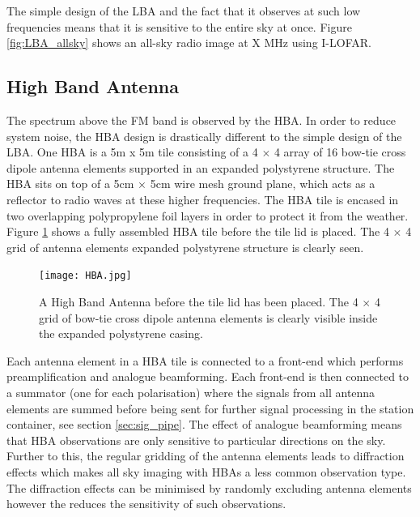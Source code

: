 The simple design of the LBA and the fact that it observes at such low frequencies means that it is sensitive to the entire sky at once. Figure \ref{fig:LBA_allsky} shows an all-sky radio image at X MHz using I-LOFAR.


\subsection{High Band Antenna}
The spectrum above the FM band is observed by the HBA. In order to reduce system noise, the HBA design is drastically different to the simple design of the LBA. One HBA is a 5m x 5m tile consisting of a 4 $\times$ 4 array of 16 bow-tie cross dipole antenna elements supported in an expanded polystyrene structure. The HBA sits on top of a 5cm $\times$ 5cm wire mesh ground plane, which acts as a reflector to radio waves at these higher frequencies. The HBA tile is encased in two overlapping polypropylene foil layers in order to protect it from the weather. Figure \ref{fig:HBA} shows a fully assembled HBA tile before the tile lid is placed. The 4 $\times$ 4 grid of antenna elements expanded polystyrene structure is clearly seen.

\begin{figure}
\centering
\texttt{[image: HBA.jpg]}
\caption[The inside of a High Band Antenna tile.]{A High Band Antenna before the tile lid has been placed. The  4 $\times$ 4 grid of bow-tie cross dipole antenna elements is clearly visible inside the expanded polystyrene casing.}
\label{fig:HBA}
\end{figure}

Each antenna element in a HBA tile is connected to a front-end which performs preamplification and analogue beamforming. Each front-end is then connected to a summator (one for each polarisation) where the signals from all antenna elements are summed before being sent for further signal processing in the station container, see section \ref{sec:sig_pipe}. The effect of analogue beamforming means that HBA observations are only sensitive to particular directions on the sky. Further to this, the regular gridding of the antenna elements leads to diffraction effects which makes all sky imaging with HBAs a less common observation type. The diffraction effects can be minimised by randomly excluding antenna elements however the reduces the sensitivity of such observations.

